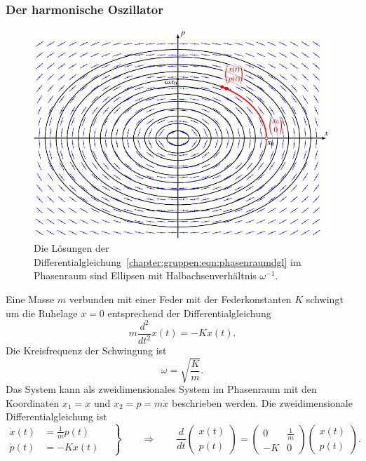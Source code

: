 \subsubsection{Der harmonische Oszillator}
%
%
\begin{figure}
\centering
\includegraphics{chapters/60-gruppen/images/phasenraum.pdf}
\caption{Die Lösungen der
Differentialgleichung~\eqref{chapter:gruppen:eqn:phasenraumdgl}
im Phasenraum sind Ellipsen mit Halbachsenverhältnis $\omega^{-1}$.
\label{chapter:gruppen:fig:phasenraum}}
\end{figure}
Eine Masse $m$ verbunden mit einer Feder mit der Federkonstanten $K$
%
schwingt um die Ruhelage $x=0$ entsprechend der Differentialgleichung
\[
m\frac{d^2}{dt^2} x(t) =  -Kx(t).
\]
Die Kreisfrequenz der Schwingung ist
%
%
\[
\omega = \sqrt{\frac{K}{m}}.
\]
Das System kann als zweidimensionales System im Phasenraum mit den 
Koordinaten $x_1=x$ und $x_2=p=m\dot{x}$ beschrieben werden.
Die zweidimensionale Differentialgleichung ist
%
\begin{equation}
\left.
\begin{aligned}
\dot{x}(t) &= \frac{1}{m}p(t)\\
\dot{p}(t) &= -Kx(t) 
\end{aligned}
\quad
\right\}
\qquad\Rightarrow\qquad
\frac{d}{dt}
\begin{pmatrix}x(t)\\p(t)\end{pmatrix}
=
\begin{pmatrix}
0&\frac{1}{m}\\
-K&0
\end{pmatrix}
\begin{pmatrix}x(t)\\p(t)\end{pmatrix}.
\label{chapter:gruppen:eqn:phasenraumdgl}
\end{equation}
